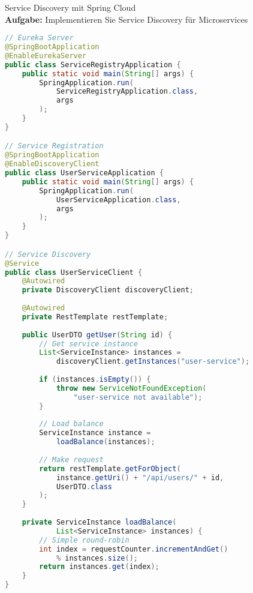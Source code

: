 \begin{example2}{Service Discovery mit Spring Cloud}\\
\textbf{Aufgabe:} Implementieren Sie Service Discovery für Microservices

\begin{lstlisting}[language=Java, style=base]
// Eureka Server
@SpringBootApplication
@EnableEurekaServer
public class ServiceRegistryApplication {
    public static void main(String[] args) {
        SpringApplication.run(
            ServiceRegistryApplication.class, 
            args
        );
    }
}

// Service Registration
@SpringBootApplication
@EnableDiscoveryClient
public class UserServiceApplication {
    public static void main(String[] args) {
        SpringApplication.run(
            UserServiceApplication.class, 
            args
        );
    }
}

// Service Discovery
@Service
public class UserServiceClient {
    @Autowired
    private DiscoveryClient discoveryClient;
    
    @Autowired
    private RestTemplate restTemplate;
    
    public UserDTO getUser(String id) {
        // Get service instance
        List<ServiceInstance> instances = 
            discoveryClient.getInstances("user-service");
            
        if (instances.isEmpty()) {
            throw new ServiceNotFoundException(
                "user-service not available");
        }
        
        // Load balance
        ServiceInstance instance = 
            loadBalance(instances);
            
        // Make request
        return restTemplate.getForObject(
            instance.getUri() + "/api/users/" + id,
            UserDTO.class
        );
    }
    
    private ServiceInstance loadBalance(
            List<ServiceInstance> instances) {
        // Simple round-robin
        int index = requestCounter.incrementAndGet() 
            % instances.size();
        return instances.get(index);
    }
}
\end{lstlisting}
\end{example2}